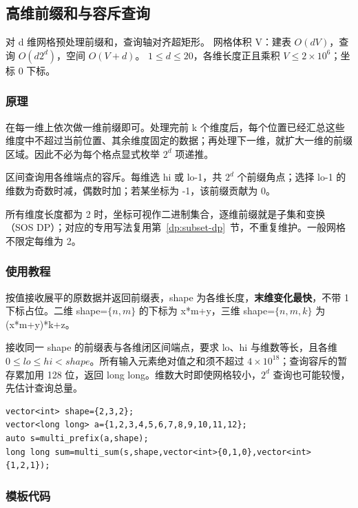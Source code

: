 \subsection{高维前缀和与容斥查询}
\label{other:prefix-multi}
\AlgorithmInfo
    {对 d 维网格预处理前缀和，查询轴对齐超矩形。}
    {网格体积 V：建表 $O(dV)$，查询 $O(d2^d)$，空间 $O(V+d)$。}
    {$1\le d\le20$，各维长度正且乘积 $V\le2\times10^6$；坐标 0 下标。}
\subsubsection*{原理}
在每一维上依次做一维前缀即可。处理完前 k 个维度后，每个位置已经汇总这些维度中不超过当前位置、其余维度固定的数据；再处理下一维，就扩大一维的前缀区域。因此不必为每个格点显式枚举 $2^d$ 项递推。

区间查询用各维端点的容斥。每维选 hi 或 lo-1，共 $2^d$ 个前缀角点；选择 lo-1 的维数为奇数时减，偶数时加；若某坐标为 -1，该前缀贡献为 0。

所有维度长度都为 2 时，坐标可视作二进制集合，逐维前缀就是子集和变换（SOS DP）；对应的专用写法复用第~\ref{dp:subset-dp}~节，不重复维护。一般网格不限定每维为 2。
\subsubsection*{使用教程}
 按值接收展平的原数据并返回前缀表，shape 为各维长度，\textbf{末维变化最快}，不带 1 下标占位。二维 shape=$\{n,m\}$ 的下标为 x*m+y，三维 shape=$\{n,m,k\}$ 为 (x*m+y)*k+z。

 接收同一 shape 的前缀表与各维闭区间端点，要求 lo、hi 与维数等长，且各维 $0\le lo\le hi<shape$。所有输入元素绝对值之和须不超过 $4\times10^{18}$；查询容斥的暂存累加用 128 位，返回 long long。维数大时即使网格较小，$2^d$ 查询也可能较慢，先估计查询总量。
\begin{lstlisting}[style=mtycpp,numbers=none]
vector<int> shape={2,3,2};
vector<long long> a={1,2,3,4,5,6,7,8,9,10,11,12};
auto s=multi_prefix(a,shape);
long long sum=multi_sum(s,shape,vector<int>{0,1,0},vector<int>{1,2,1});
\end{lstlisting}
\subsubsection*{模板代码}
